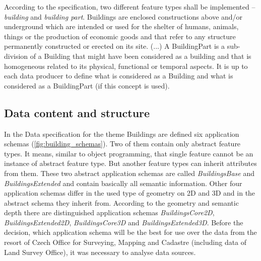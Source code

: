 \documentclass[eprint]{actapoly}
\begin{document}
According to the specification, two different feature types shall be implemented -- \textit{building} and \textit{building part}. Buildings are enclosed constructions above and/or underground which are intended or used for the shelter of humans, animals, things or the production of economic goods and that refer to any structure permanently constructed or erected on its site. (...) A BuildingPart is a sub-division of a Building that might have been considered as a building and that is homogeneous related to its physical, functional or temporal aspects. It is up to each data producer to define what is considered as a Building and what is considered as a BuildingPart (if this concept is used). \cite{INSPIRE:DSBU}

\subsection{Data content and structure}
\label{sec:content}

In the Data specification for the theme Buildings are defined six application schemas (\ref{fig:building_schemas}). Two of them contain only abstract feature types. It means, similar to object programming, that single feature cannot be an instance of abstract feature type. But another feature types can inherit attributes from them. These two abstract application schemas are called \textit{BuildingsBase} and \textit{BuildingsExtended} and contain basically all semantic information. Other four application schemas differ in the used type of geometry on 2D and 3D and in the abstract schema they inherit from. According to the geometry and semantic depth there are distinguished application schemas \textit{BuildingsCore2D}, \textit{BuildingsExtended2D}, \textit{BuildingsCore3D} and \textit{BuildingsExtended3D}. Before the decision, which application schema will be the best for use over the data from the resort of Czech Office for Surveying, Mapping and Cadastre (including data of Land Survey Office), it was necessary to analyse data sources.
\end{document}
